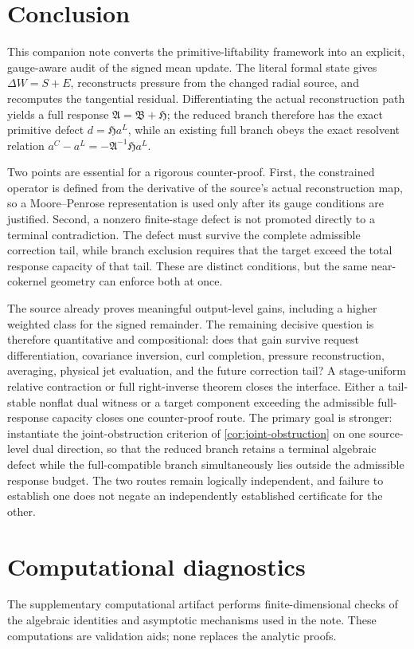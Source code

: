 \documentclass[12pt]{article}
\theoremstyle{plain}
\theoremstyle{definition}
\theoremstyle{remark}
\newcommand{\Comp}{\mathfrak A}
\newcommand{\Red}{\mathfrak B}
\newcommand{\Hidden}{\mathfrak H}
\begin{document}
\section{Conclusion}\label{sec:conclusion}
This companion note converts the primitive-liftability framework into an explicit, gauge-aware audit of the signed mean update. The literal formal state gives \(\Delta W=S+E\), reconstructs pressure from the changed radial source, and recomputes the tangential residual. Differentiating the actual reconstruction path yields a full response \(\Comp=\Red+\Hidden\); the reduced branch therefore has the exact primitive defect \(d=\Hidden a^L\), while an existing full branch obeys the exact resolvent relation \(a^C-a^L=-\Comp^{-1}\Hidden a^L\).

Two points are essential for a rigorous counter-proof. First, the constrained operator is defined from the derivative of the source's actual reconstruction map, so a Moore--Penrose representation is used only after its gauge conditions are justified. Second, a nonzero finite-stage defect is not promoted directly to a terminal contradiction. The defect must survive the complete admissible correction tail, while branch exclusion requires that the target exceed the total response capacity of that tail. These are distinct conditions, but the same near-cokernel geometry can enforce both at once.

The source already proves meaningful output-level gains, including a higher weighted class for the signed remainder. The remaining decisive question is therefore quantitative and compositional: does that gain survive request differentiation, covariance inversion, curl completion, pressure reconstruction, averaging, physical jet evaluation, and the future correction tail? A stage-uniform relative contraction or full right-inverse theorem closes the interface. Either a tail-stable nonflat dual witness or a target component exceeding the admissible full-response capacity closes one counter-proof route. The primary goal is stronger: instantiate the joint-obstruction criterion of \cref{cor:joint-obstruction} on one source-level dual direction, so that the reduced branch retains a terminal algebraic defect while the full-compatible branch simultaneously lies outside the admissible response budget. The two routes remain logically independent, and failure to establish one does not negate an independently established certificate for the other.

\appendix
\section{Computational diagnostics}\label{sec:computations}
The supplementary computational artifact  performs finite-dimensional checks of the algebraic identities and asymptotic mechanisms used in the note. These computations are validation aids; none replaces the analytic proofs.
\end{document}
